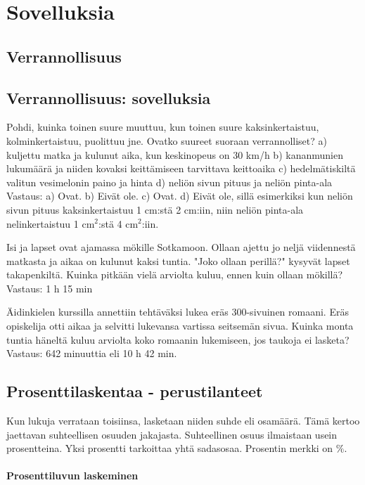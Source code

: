 %
\part{Sovelluksia}
%
%
\chapter{Verrannollisuus}
\chapter{Verrannollisuus: sovelluksia}

Pohdi, kuinka toinen suure muuttuu, kun toinen suure kaksinkertaistuu, kolminkertaistuu, puolittuu jne. Ovatko suureet suoraan verrannolliset?
a) kuljettu matka ja kulunut aika, kun keskinopeus on 30 km/h
b) kananmunien lukumäärä ja niiden kovaksi keittämiseen tarvittava keittoaika
c) hedelmätiskiltä valitun vesimelonin paino ja hinta
d) neliön sivun pituus ja neliön pinta-ala
Vastaus:
a) Ovat.
b) Eivät ole.
c) Ovat.
d) Eivät ole, sillä esimerkiksi kun neliön sivun pituus kaksinkertaistuu 1 cm:stä 2 cm:iin, niin neliön pinta-ala nelinkertaistuu 1 cm$^2$:stä 4 cm$^2$:iin.

Isi ja lapset ovat ajamassa mökille Sotkamoon. Ollaan ajettu jo neljä viidennestä matkasta ja aikaa on kulunut kaksi tuntia. "Joko ollaan perillä?" kysyvät lapset takapenkiltä. Kuinka pitkään vielä arviolta kuluu, ennen kuin ollaan mökillä?
Vastaus: 1 h 15 min

Äidinkielen kurssilla annettiin tehtäväksi lukea eräs 300-sivuinen romaani. Eräs opiskelija otti aikaa ja selvitti lukevansa vartissa seitsemän sivua. Kuinka monta tuntia häneltä kuluu arviolta koko romaanin lukemiseen, jos taukoja ei lasketa?
Vastaus: 642 minuuttia eli 10 h 42 min.

\chapter{Prosenttilaskentaa - perustilanteet}

Kun lukuja verrataan toisiinsa, lasketaan niiden suhde eli osamäärä. Tämä kertoo jaettavan suhteellisen osuuden jakajasta. Suhteellinen osuus ilmaistaan usein prosentteina. Yksi prosentti tarkoittaa yhtä sadasosaa. Prosentin merkki on $\%$.


\subsection{Prosenttiluvun laskeminen}

